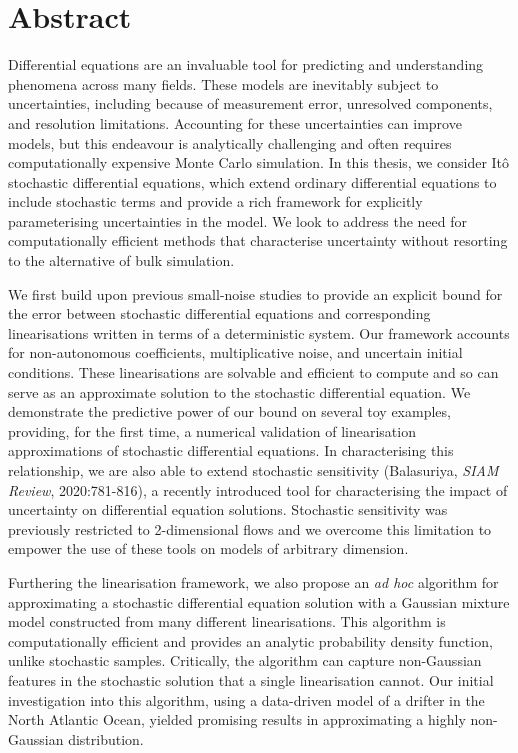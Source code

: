 \chapter{Abstract}
 {\small
  Differential equations are an invaluable tool for predicting and understanding phenomena across many fields.
  These models are inevitably subject to uncertainties, including because of measurement error, unresolved components, and resolution limitations.
  Accounting for these uncertainties can improve models, but this endeavour is analytically challenging and often requires computationally expensive Monte Carlo simulation.
  In this thesis, we consider It\^o stochastic differential equations, which extend ordinary differential equations to include stochastic terms and provide a rich framework for explicitly parameterising uncertainties in the model.
  We look to address the need for computationally efficient methods that characterise uncertainty without resorting to the alternative of bulk simulation.

  We first build upon previous small-noise studies to provide an explicit bound for the error between stochastic differential equations and corresponding linearisations written in terms of a deterministic system.
  Our framework accounts for non-autonomous coefficients, multiplicative noise, and uncertain initial conditions.
  These linearisations are solvable and efficient to compute and so can serve as an approximate solution to the stochastic differential equation.
  We demonstrate the predictive power of our bound on several toy examples, providing, for the first time, a numerical validation of linearisation approximations of stochastic differential equations.
  In characterising this relationship, we are also able to extend stochastic sensitivity (Balasuriya, \emph{SIAM Review}, 2020:781-816), a recently introduced tool for characterising the impact of uncertainty on differential equation solutions.
  Stochastic sensitivity was previously restricted to 2-dimensional flows and we overcome this limitation to empower the use of these tools on models of arbitrary dimension.

  Furthering the linearisation framework, we also propose an \emph{ad hoc} algorithm for approximating a stochastic differential equation solution with a Gaussian mixture model constructed from many different linearisations.
  This algorithm is computationally efficient and provides an analytic probability density function, unlike stochastic samples.
  Critically, the algorithm can capture non-Gaussian features in the stochastic solution that a single linearisation cannot.
  Our initial investigation into this algorithm, using a data-driven model of a drifter in the North Atlantic Ocean, yielded promising results in approximating a highly non-Gaussian distribution.

}
